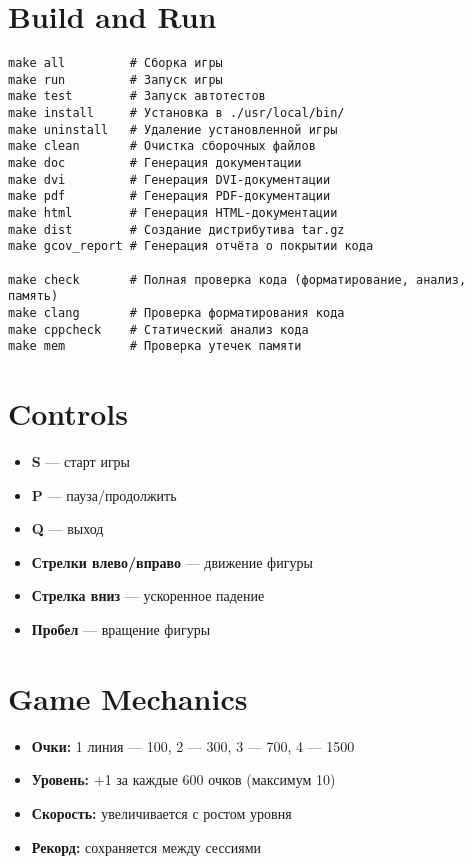 \documentclass{article}
\begin{document}
\section{Build and Run}
\begin{verbatim}
make all         # Сборка игры
make run         # Запуск игры
make test        # Запуск автотестов
make install     # Установка в ./usr/local/bin/
make uninstall   # Удаление установленной игры
make clean       # Очистка сборочных файлов
make doc         # Генерация документации
make dvi         # Генерация DVI-документации
make pdf         # Генерация PDF-документации
make html        # Генерация HTML-документации
make dist        # Создание дистрибутива tar.gz
make gcov_report # Генерация отчёта о покрытии кода

make check       # Полная проверка кода (форматирование, анализ, память)
make clang       # Проверка форматирования кода
make cppcheck    # Статический анализ кода
make mem         # Проверка утечек памяти
\end{verbatim}

\section{Controls}
\begin{itemize}
  \item \textbf{S} — старт игры
  \item \textbf{P} — пауза/продолжить
  \item \textbf{Q} — выход
  \item \textbf{Стрелки влево/вправо} — движение фигуры
  \item \textbf{Стрелка вниз} — ускоренное падение
  \item \textbf{Пробел} — вращение фигуры
\end{itemize}

\section{Game Mechanics}
\begin{itemize}
  \item \textbf{Очки:} 1 линия — 100, 2 — 300, 3 — 700, 4 — 1500
  \item \textbf{Уровень:} +1 за каждые 600 очков (максимум 10)
  \item \textbf{Скорость:} увеличивается с ростом уровня
  \item \textbf{Рекорд:} сохраняется между сессиями
\end{itemize}
\end{document}
